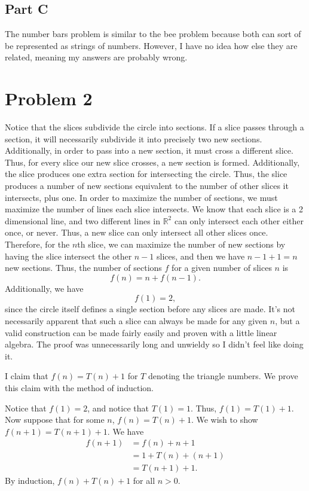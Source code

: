 \documentclass[11pt, letterpaper]{article}
\begin{document}
\subsection*{Part C}
The number bars problem is similar to the bee problem because both can sort of be represented as strings of numbers. However, I have no idea how else they are related, meaning my answers are probably wrong.

\section*{Problem 2}
Notice that the slices subdivide the circle into sections. If a slice passes through a section, it will necessarily subdivide it into precisely two new sections. Additionally, in order to pass into a new section, it must cross a different slice. Thus, for every slice our new slice crosses, a new section is formed. Additionally, the slice produces one extra section for intersecting the circle. Thus, the slice produces a number of new sections equivalent to the number of other slices it intersects, plus one. In order to maximize the number of sections, we must maximize the number of lines each slice intersects. We know that each slice is a 2 dimensional line, and two different lines in $\mathbb{R}^2$ can only intersect each other either once, or never. Thus, a new slice can only intersect all other slices once. Therefore, for the $n$th slice, we can maximize the number of new sections by having the slice intersect the other $n-1$ slices, and then we have $n-1+1=n$ new sections. Thus, the number of sections $f$ for a given number of slices $n$ is
\[
	f(n)=n+f(n-1)
.\]
Additionally, we have
\[
	f(1)=2
,\]
since the circle itself defines a single section before any slices are made. It's not necessarily apparent that such a slice can always be made for any given $n$, but a valid construction can be made fairly easily and proven with a little linear algebra. The proof was unnecessarily long and unwieldy so I didn't feel like doing it.

I claim that $f(n)=T(n)+1$ for $T$ denoting the triangle numbers. We prove this claim with the method of induction.

Notice that $f(1)=2$, and notice that $T(1)=1$. Thus, $f(1)=T(1)+1$. Now suppose that for some $n$, $f(n)=T(n)+1$. We wish to show $f(n+1)=T(n+1)+1$. We have
\begin{align*}
	f(n+1)&=f(n)+n+1\\
	      &=1+T(n)+(n+1)\\
	      &=T(n+1)+1
.\end{align*}
By induction, $f(n)+T(n)+1$ for all $n>0$.
\end{document}
